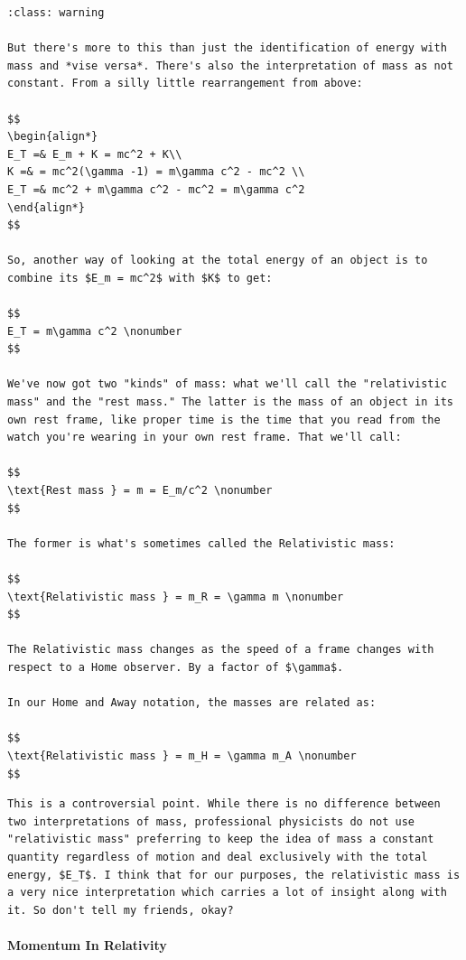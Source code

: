 \documentclass[
]{article}
\begin{document}
\begin{verbatim}
:class: warning

But there's more to this than just the identification of energy with mass and *vise versa*. There's also the interpretation of mass as not constant. From a silly little rearrangement from above:

$$
\begin{align*}
E_T =& E_m + K = mc^2 + K\\
K =& = mc^2(\gamma -1) = m\gamma c^2 - mc^2 \\
E_T =& mc^2 + m\gamma c^2 - mc^2 = m\gamma c^2
\end{align*}
$$

So, another way of looking at the total energy of an object is to combine its $E_m = mc^2$ with $K$ to get:

$$
E_T = m\gamma c^2 \nonumber
$$

We've now got two "kinds" of mass: what we'll call the "relativistic mass" and the "rest mass." The latter is the mass of an object in its own rest frame, like proper time is the time that you read from the watch you're wearing in your own rest frame. That we'll call:

$$
\text{Rest mass } = m = E_m/c^2 \nonumber
$$

The former is what's sometimes called the Relativistic mass:

$$
\text{Relativistic mass } = m_R = \gamma m \nonumber
$$

The Relativistic mass changes as the speed of a frame changes with respect to a Home observer. By a factor of $\gamma$.

In our Home and Away notation, the masses are related as:

$$
\text{Relativistic mass } = m_H = \gamma m_A \nonumber
$$
\end{verbatim}

\begin{verbatim}
This is a controversial point. While there is no difference between two interpretations of mass, professional physicists do not use "relativistic mass" preferring to keep the idea of mass a constant quantity regardless of motion and deal exclusively with the total energy, $E_T$. I think that for our purposes, the relativistic mass is a very nice interpretation which carries a lot of insight along with it. So don't tell my friends, okay?
\end{verbatim}

\hypertarget{momentum-in-relativity}{%
\paragraph{Momentum In Relativity}\label{momentum-in-relativity}}
\end{document}
